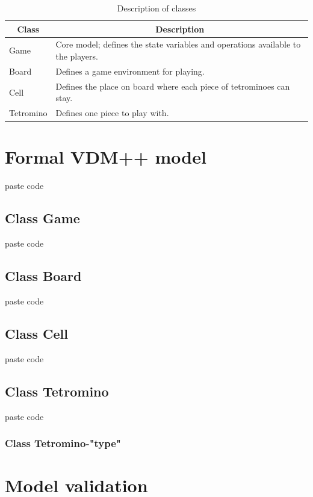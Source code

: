 \documentclass[a4paper]{article}
\begin{document}
\begin{table}[!h]
	\centering
	\label{description-classes}
	\begin{tabular}{|l|l|}
	\hline
	\multicolumn{1}{|c|}{\textbf{Class}} & \multicolumn{1}{|c|}{\textbf{Description}}	\\	\hline
	Game	&	Core model; defines the state variables and operations available to the players.	\\	\hline
	Board	&	Defines a game environment for playing. \\	\hline
	Cell	&	Defines the place on board where each piece of tetrominoes can stay. 	\\	\hline
	Tetromino	&	Defines one piece to play with.	\\	\hline
	\end{tabular}
	\caption{Description of classes}
\end{table}

\section{Formal VDM++ model}

paste code

\subsection{Class Game}

paste code

\subsection{Class Board}

paste code

\subsection{Class Cell}

paste code

\subsection{Class Tetromino}

paste code

\subsubsection{Class Tetromino-"type"}


\section{Model validation}
\end{document}
